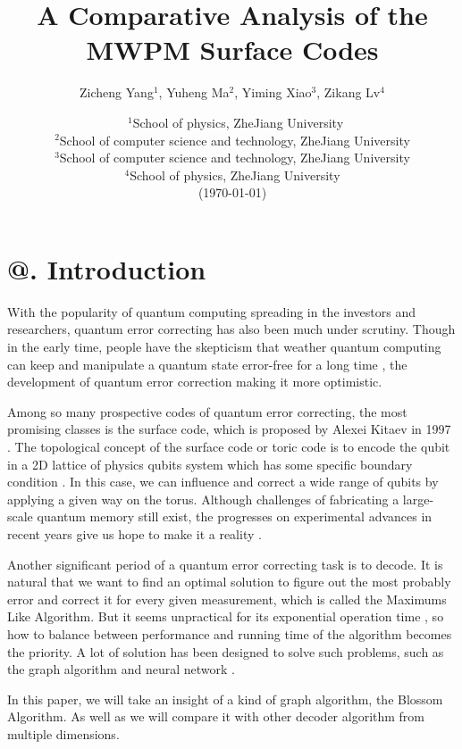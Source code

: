 \documentclass[
    a4paper, %
    10pt, %
    unnumberedsections, %
    twoside, %
]{LTJournalArticle}
\title{A Comparative Analysis of the MWPM Surface Codes} %
\author{
    Zicheng Yang$^1$, Yuheng Ma$^2$, Yiming Xiao$^3$, Zikang Lv$^4$
}
\date{\footnotesize\ $^1$School of physics, ZheJiang University \\ $^2$School of computer science and technology, ZheJiang University \\  $^3$School of computer science and technology, ZheJiang University \\  $^4$School of physics, ZheJiang University \\ (\today)}
\makeatletter
\newcommand{\Rmnum}[1]{\expandafter\@slowromancap\romannumeral #1@}
\makeatother
\begin{document}
\maketitle %


\section{\Rmnum{1}. Introduction}
With the popularity of quantum computing spreading in the investors and researchers, quantum error correcting has also been much under scrutiny. Though in the early time, people have the skepticism that weather quantum computing can keep and manipulate a quantum state error-free for a long time \cite{1}, the development of quantum error correction making it more optimistic.

Among so many prospective codes of quantum error correcting, the most promising classes is the surface code, which is proposed by Alexei Kitaev in 1997 \cite{2}. The topological concept of the surface code or toric code is to encode the qubit in a 2D lattice of physics qubits system which has some specific boundary condition \cite{3}. In this case, we can influence and correct a wide range of qubits by applying a given way on the torus. Although challenges of fabricating a large-scale quantum memory still exist, the progresses on experimental advances in recent years give us hope to make it a reality \cite{4}\cite{5}.

Another significant period of a quantum error correcting task is to decode. It is natural that we want to find an optimal solution to figure out the most probably error and correct it for every given measurement, which is called the Maximums Like Algorithm. But it seems unpractical for its exponential operation time \cite{6}, so how to balance between performance and running time of the algorithm becomes the priority. A lot of solution has been designed to solve such problems, such as the graph algorithm and neural network \cite{7}.

In this paper, we will take an insight of a kind of graph algorithm, the Blossom Algorithm. As well as we will compare it with other decoder algorithm from multiple dimensions.

\end{document}
